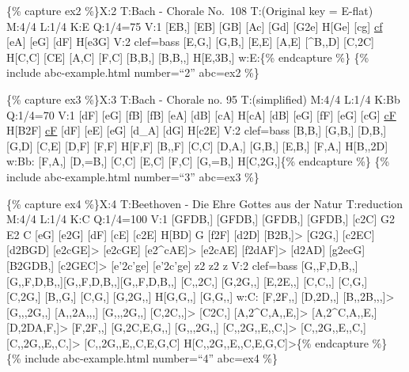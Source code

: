 \documentclass{book}
\begin{document}
\{\% capture ex2 \%\}X:2 T:Bach - Chorale No.~108 T:(Original key = E-flat)
M:4/4 L:1/4 K:E Q:1/4=75 V:1 {[}EB,{]}\textbar{} {[}EB{]} {[}GB{]} {[}Ac{]}
{[}Gd{]}\textbar{} {[}G2e{]} H{[}Ge{]} {[}cg{]}\textbar{}
\href{cantusFirmus.html}{cf} {[}eA{]} {[}eG{]} {[}dF{]}\textbar{}
H{[}e3G{]}\textbar{]} V:2 clef=bass {[}E,G,{]}\textbar{} {[}G,B,{]} {[}E,E{]}
{[}A,E{]} {[}\^{}B,,D{]}\textbar{} {[}C,2C{]} H{[}C,C{]} {[}CE{]}\textbar{}
{[}A,C{]} {[}F,C{]} {[}B,B,{]} {[}B,B,,{]}\textbar{} H{[}E,3B,{]}\textbar{}
w:E:\{\% endcapture \%\} \{\% include abc-example.html number=``2'' abc=ex2
\%\}

\{\% capture ex3 \%\}X:3 T:Bach - Chorale no. 95 T:(simplified) M:4/4 L:1/4
K:Bb Q:1/4=70 V:1 {[}dF{]} {[}eG{]} {[}fB{]} {[}fB{]}\textbar{} {[}eA{]}
{[}dB{]} {[}cA{]} H{[}cA{]}\textbar{} {[}dB{]} {[}eG{]} {[}fF{]}
{[}eG{]}\textbar{} {[}cG{]} \href{cantusFirmus.html}{cF} H{[}B2F{]}\textbar{}
\href{cantusFirmus.html}{cF} {[}dF{]} {[}eE{]} {[}eG{]}\textbar{} {[}d\_A{]}
{[}dG{]} H{[}c2E{]}\textbar{]} V:2 clef=bass {[}B,B,{]} {[}G,B,{]} {[}D,B,{]}
{[}G,D{]}\textbar{} {[}C,E{]} {[}D,F{]} {[}F,F{]} H{[}F,F{]}\textbar{}
{[}B,,F{]} {[}C,C{]} {[}D,A,{]} {[}G,B,{]}\textbar{} {[}E,B,{]} {[}F,A,{]}
H{[}B,,2D{]}\textbar{} w:Bb: {[}F,A,{]} {[}D,=B,{]} {[}C,C{]}
{[}E,C{]}\textbar{} {[}F,C{]} {[}G,=B,{]} H{[}C,2G,{]}\textbar{]}\{\%
endcapture \%\} \{\% include abc-example.html number=``3'' abc=ex3 \%\}

\{\% capture ex4 \%\}X:4 T:Beethoven - Die Ehre Gottes aus der Natur
T:reduction M:4/4 L:1/4 K:C Q:1/4=100 V:1 {[}GFDB,{]} {[}GFDB,{]} {[}GFDB,{]}
{[}GFDB,{]}\textbar{} {[}c2C{]} G2\textbar{} E2 C {[}eG{]}\textbar{} {[}e2G{]}
{[}dF{]} {[}cE{]}\textbar{} {[}c2E{]} H{[}BD{]} G\textbar{} {[}f2F{]}
{[}d2D{]}\textbar{} {[}B2B,{]}\textgreater{} {[}G2G,{]}\textbar{} {[}c2EC{]}
{[}d2BGD{]}\textbar{} {[}e2cGE{]}\textgreater{} {[}e2cGE{]}\textbar{}
{[}e2\^{}cAE{]}\textgreater{} {[}e2cAE{]}\textbar{} {[}f2dAF{]}\textgreater{}
{[}d2AD{]}\textbar{} {[}g2ecG{]} {[}B2GDB,{]}\textbar{}
{[}c2GEC{]}\textgreater{} {[}e'2c'ge{]}\textbar{} {[}e'2c'ge{]} z2\textbar{}
z2 z\textbar{]} V:2 clef=bass {[}G,,F,D,B,,{]}
{[}G,,F,D,B,,{]}{[}G,,F,D,B,,{]}{[}G,,F,D,B,,{]}\textbar{} {[}C,,2C,{]}
{[}G,2G,,{]}\textbar{} {[}E,2E,,{]} {[}C,C,,{]} {[}C,G,{]}\textbar{}
{[}C,2G,{]} {[}B,,G,{]} {[}C,G,{]}\textbar{} {[}G,2G,,{]} H{[}G,G,,{]}
{[}G,G,,{]}\textbar{} w:C: {[}F,2F,,{]} {[}D,2D,,{]}\textbar{}
{[}B,,2B,,,{]}\textgreater{} {[}G,,,2G,,{]}\textbar{} {[}A,,2A,,,{]}
{[}G,,,2G,,{]}\textbar{} {[}C,2C,,{]}\textgreater{} {[}C2C,{]}\textbar{}
{[}A,2\^{}C,A,,E,{]}\textgreater{} {[}A,2\^{}C,A,,E,{]}\textbar{}
{[}D,2DA,F,{]}\textgreater{} {[}F,2F,,{]}\textbar{} {[}G,2C,E,G,,{]}
{[}G,,,2G,,{]}\textbar{} {[}C,,2G,,E,,C,{]}\textgreater{}
{[}C,,2G,,E,,C,{]}\textbar{} {[}C,,2G,,E,,C,{]}\textgreater{}
{[}C,,2G,,E,,C,E,G,C{]}\textbar{}
H{[}C,,2G,,E,,C,E,G,C{]}\textgreater\textbar{]}\{\% endcapture \%\} \{\%
include abc-example.html number=``4'' abc=ex4 \%\}
\end{document}
